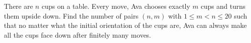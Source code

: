 There are $n$ cups on a table. Every move, Ava chooses exactly $m$ cups and turns them upside down. Find the number of pairs $(n, m)$ with $1 \le m < n \le 20$ such that no matter what the initial orientation of the cups are, Ava can always make all the cups face down after finitely many moves.
